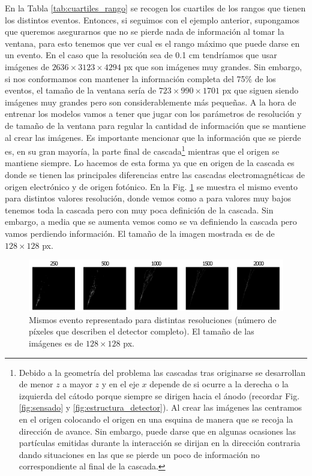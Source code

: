 \documentclass[a4paper,12pt,twoside,titlepage]{article}
\begin{document}
En la Tabla \ref{tab:cuartiles_rango} se recogen los cuartiles de los rangos que tienen los distintos eventos. Entonces, si seguimos con el ejemplo anterior, supongamos que queremos asegurarnos que no se pierde nada de información al tomar la ventana, para esto tenemos que ver cual es el rango máximo que puede darse en un evento. En el caso que la resolución sea de 0.1 cm tendríamos que usar imágenes de $2636\times 3123\times 4294$ px que son imágenes muy grandes. Sin embargo, si nos conformamos con mantener la información completa del 75\% de los eventos, el tamaño de la ventana sería de $723\times 990\times 1701$ px que siguen siendo imágenes muy grandes pero son considerablemente más pequeñas. A la hora de entrenar los modelos vamos a tener que jugar con los parámetros de resolución y de tamaño de la ventana para regular la cantidad de información que se mantiene al crear las imágenes. Es importante mencionar que la información que se pierde es, en su gran mayoría, la parte final de cascada\footnote{Debido a la geometría del problema las cascadas tras originarse se desarrollan de menor $z$ a mayor $z$ y en el eje $x$ depende de si ocurre a la derecha o la izquierda del cátodo porque siempre se dirigen hacia el ánodo (recordar Fig. \ref{fig:sensado} y \ref{fig:estructura_detector}). Al crear las imágenes las centramos en el origen colocando el origen en una esquina de manera que se recoja la dirección de avance. Sin embargo, puede darse que en algunas ocasiones las partículas emitidas durante la interacción se dirijan en la dirección contraria dando situaciones en las que se pierde un poco de información no correspondiente al final de la cascada.} mientras que el origen se mantiene siempre. Lo hacemos de esta forma ya que en origen de la cascada es donde se tienen las principales diferencias entre las cascadas electromagnéticas de origen electrónico y de origen fotónico. En la Fig. \ref{fig:varias_resoluciones} se muestra el mismo evento para distintos valores resolución, donde vemos como a para valores muy bajos tenemos toda la cascada pero con muy poca definición de la cascada. Sin embargo, a media que se aumenta vemos como se va definiendo la cascada pero vamos perdiendo información. El tamaño de la imagen mostrada es de de $128\times128$ px.

\begin{figure}[h!]
  \centering
  \includegraphics[scale=0.65, center]{varias_resoluciones.pdf}
  \caption{Mismos evento representado para distintas resoluciones (número de píxeles que describen el detector completo). El tamaño de las imágenes es de $128\times128$ px.}
  \label{fig:varias_resoluciones}
\end{figure}
\end{document}
